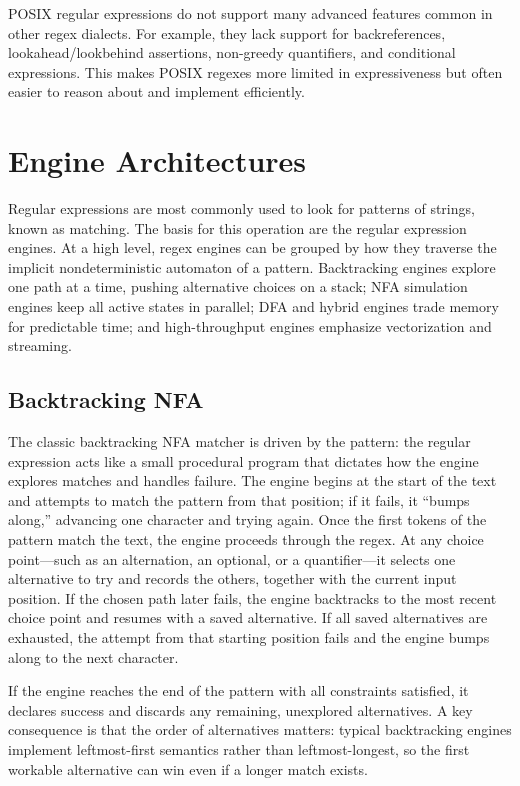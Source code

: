 POSIX regular expressions do not support many advanced features common in other regex dialects. For example, they lack support for backreferences, lookahead/lookbehind assertions, non-greedy quantifiers, and conditional expressions. This makes POSIX regexes more limited in expressiveness but often easier to reason about and implement efficiently.

\section{Engine Architectures}
Regular expressions are most commonly used to look for patterns of strings, known as matching. The basis for this operation are the regular expression engines.
At a high level, regex engines can be grouped by how they traverse the implicit nondeterministic automaton of a pattern. Backtracking engines explore one path at a time, pushing alternative choices on a stack; NFA simulation engines keep all active states in parallel; DFA and hybrid engines trade memory for predictable time; and high-throughput engines emphasize vectorization and streaming.

\subsection{Backtracking NFA}
The classic backtracking NFA matcher is driven by the pattern: the regular expression acts like a small procedural program that dictates how the engine explores matches and handles failure. The engine begins at the start of the text and attempts to match the pattern from that position; if it fails, it “bumps along,” advancing one character and trying again. Once the first tokens of the pattern match the text, the engine proceeds through the regex. At any choice point—such as an alternation, an optional, or a quantifier—it selects one alternative to try and records the others, together with the current input position. If the chosen path later fails, the engine backtracks to the most recent choice point and resumes with a saved alternative. If all saved alternatives are exhausted, the attempt from that starting position fails and the engine bumps along to the next character.

If the engine reaches the end of the pattern with all constraints satisfied, it declares success and discards any remaining, unexplored alternatives. A key consequence is that the order of alternatives matters: typical backtracking engines implement leftmost-first semantics rather than leftmost-longest, so the first workable alternative can win even if a longer match exists.

